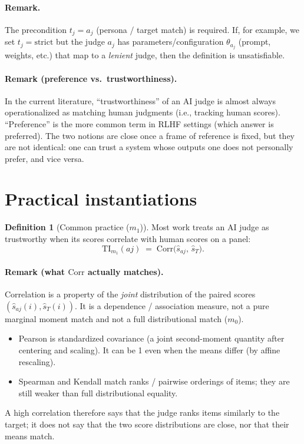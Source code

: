 \documentclass{article}
\theoremstyle{definition}
\newtheorem{definition}{Definition}
\theoremstyle{remark}
\newcommand{\TI}{\mathrm{TI}}
\begin{document}
\paragraph{Remark.}
The precondition \(t_j = a_j\) (persona / target match) is required.
If, for example, we set \(t_j = \text{strict}\) but the judge \(a_j\) has parameters/configuration
\(\theta_{a_j}\) (prompt, weights, etc.) that map to a \emph{lenient} judge,
then the definition is unsatisfiable.

\paragraph{Remark (preference vs.\ trustworthiness).}
In the current literature, ``trustworthiness'' of an AI judge is almost always operationalized as matching human judgments (i.e., tracking human scores).
``Preference'' is the more common term in RLHF settings (which answer is preferred).
The two notions are close once a frame of reference is fixed, but they are not identical:
one can trust a system whose outputs one does not personally prefer, and vice versa.

\section{Practical instantiations}

\begin{definition}[Common practice (\(m_1\))]
Most work treats an AI judge as trustworthy when its scores correlate with human scores on a panel:
\[
\TI_{m_1}(aj) \;=\; \mathrm{Corr}\bigl(\hat s_{aj},\, \hat s_T\bigr).
\]
\end{definition}

\paragraph{Remark (what \(\mathrm{Corr}\) actually matches).}
Correlation is a property of the \emph{joint} distribution of the paired scores \((\hat s_{aj}(i), \hat s_T(i))\).
It is a dependence / association measure, not a pure marginal moment match and not a full distributional match (\(m_0\)).
\begin{itemize}
  \item Pearson is standardized covariance (a joint second-moment quantity after centering and scaling). It can be 1 even when the means differ (by affine rescaling).
  \item Spearman and Kendall match ranks / pairwise orderings of items; they are still weaker than full distributional equality.
\end{itemize}
A high correlation therefore says that the judge ranks items similarly to the target; it does not say that the two score distributions are close, nor that their means match.
\end{document}
